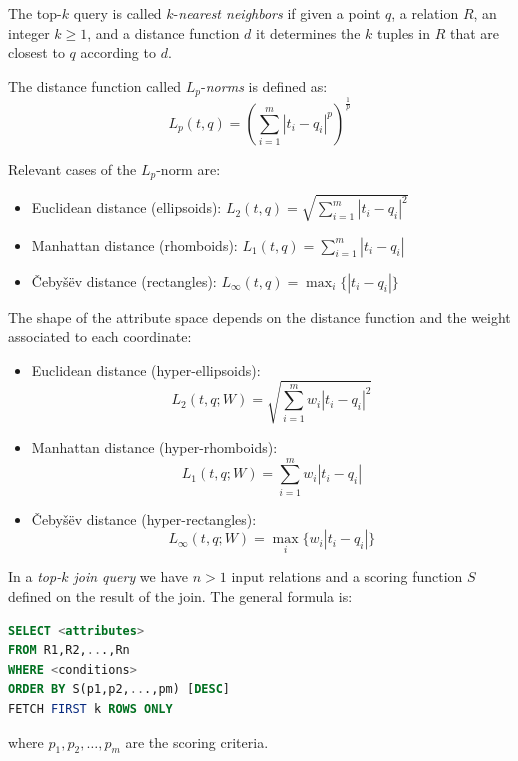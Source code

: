 \documentclass[12pt, a4paper]{report}
\newtheorem[style=M,bodystyle=\normalfont]{theorem}{Theorem}
\newtheorem[style=M,bodystyle=\normalfont]{corollary}{Corollary}
\newtheorem[style=M,bodystyle=\normalfont]{lemma}{Lemma}
\newtheorem[style=M,bodystyle=\normalfont]{definition}{Definition}
\begin{document}
    \begin{definition}
        The top-$k$ query is called $k$-\emph{nearest neighbors} if given a point $q$, a relation $R$, an integer $k \geq 1$, and a distance function $d$ it determines the $k$ tuples 
        in $R$ that are closest to $q$ according to $d$. 

        The distance function called $L_p$-\emph{norms} is defined as:
        \[L_p(t,q)=\left(\sum_{i=1}^{m}{\left\lvert t_i-q_i \right\rvert^{p}}\right)^{\frac{1}{p}}\]
    \end{definition}
    Relevant cases of the $L_p$-norm are: 
    \begin{itemize}
        \item Euclidean distance (ellipsoids): $L_2(t,q)=\sqrt{\sum_{i=1}^{m}{\left\lvert t_i-q_i \right\rvert^{2}}}$
        \item Manhattan distance (rhomboids): $L_1(t,q)=\sum_{i=1}^{m}{\left\lvert t_i-q_i \right\rvert}$
        \item Čebyšëv distance (rectangles): $L_{\infty}(t,q)=\max_{i}\{\left\lvert t_i-q_i\right\rvert\}$
    \end{itemize}
    The shape of the attribute space depends on the distance function and the weight associated to each coordinate: 
    \begin{itemize}
        \item Euclidean distance (hyper-ellipsoids):
            \[L_2(t,q;W)=\sqrt{\sum_{i=1}^{m}{w_i\left\lvert t_i-q_i \right\rvert^{2}}}\]
        \item Manhattan distance (hyper-rhomboids): 
            \[L_1(t,q;W)=\sum_{i=1}^{m}{w_i\left\lvert t_i-q_i \right\rvert}\]
        \item Čebyšëv distance (hyper-rectangles): 
            \[L_{\infty}(t,q;W)=\max_{i}\{w_i \left\lvert t_i-q_i\right\rvert\}\]
    \end{itemize}
    \begin{definition}
        In a \emph{top-$k$ join query} we have $n > 1$ input relations and a scoring function $S$ defined on the result of the join. The general formula is: 
        \begin{lstlisting}[language=SQL]
SELECT <attributes>
FROM R1,R2,...,Rn
WHERE <conditions>
ORDER BY S(p1,p2,...,pm) [DESC]
FETCH FIRST k ROWS ONLY             
        \end{lstlisting}
        where $p_1,p_2,\dots,p_m$ are the scoring criteria. 
    \end{definition}
\end{document}
